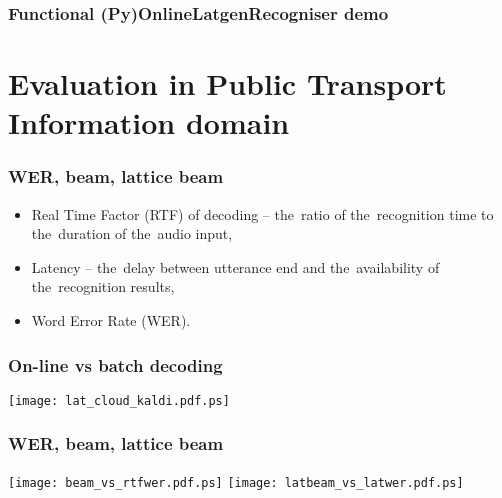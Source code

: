 \begin{frame}\frametitle{Functional (Py)OnlineLatgenRecogniser demo} 
    \begin{center}
        
    \end{center}
\end{frame}


\section[Evaluation in PTI]{Evaluation in Public Transport Information domain}%

\begin{frame}\frametitle{WER, beam, lattice beam} 
    \begin{itemize}
        \item Real Time Factor (RTF) of decoding -- the~ratio of the~recognition time to the~duration of the~audio input,
        \item Latency -- the~delay between utterance end and the~availability of the~recognition results,
        \item Word Error Rate (WER).
    \end{itemize}
\end{frame}

\begin{frame}\frametitle{On-line vs batch decoding} 
    \begin{center}
        \texttt{[image: lat\_cloud\_kaldi.pdf.ps]}
    \end{center}
\end{frame}

\begin{frame}\frametitle{WER, beam, lattice beam} 
    \texttt{[image: beam\_vs\_rtfwer.pdf.ps]}
    \texttt{[image: latbeam\_vs\_latwer.pdf.ps]}
\end{frame}

